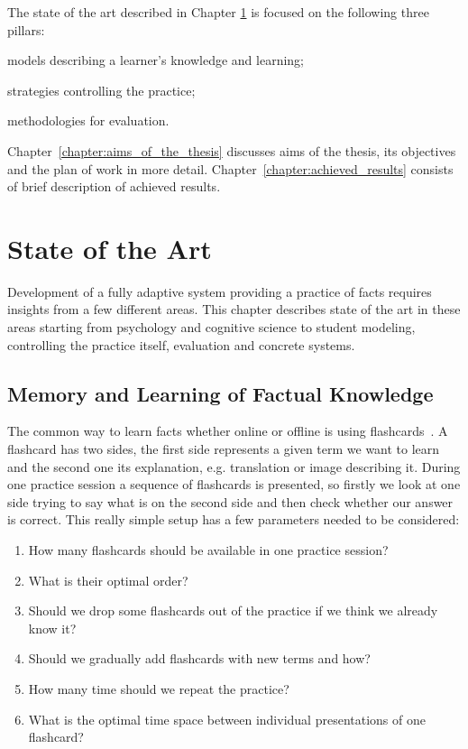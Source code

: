 \documentclass[table,color,cover,twoside,nolot,nolof]{fithesis3/fithesis3}
\begin{document}
The state of the art described in Chapter
\ref{chapter:state_of_the_art} is focused on the following three pillars:
\begin{enumerate*}[label=(\arabic*)]
	\item models describing a learner's knowledge and learning;
	\item strategies controlling the practice;
	\item methodologies for evaluation.
\end{enumerate*}
Chapter~\ref{chapter:aims_of_the_thesis} discusses aims of the thesis, its
objectives and the plan of work in more detail.
Chapter~\ref{chapter:achieved_results} consists of brief description of
achieved results.

\chapter{State of the Art}
\label{chapter:state_of_the_art}

Development of a fully adaptive system providing a practice of facts requires
insights from a few different areas. This chapter describes state of the art in
these areas starting from psychology and cognitive science to student
modeling, controlling the practice itself, evaluation and concrete systems.

\section{Memory and Learning of Factual Knowledge}
\label{section:models}

The common way to learn facts whether online or offline is using
flashcards~\cite{kornell2008optimising}. A flashcard has two sides, the first
side represents a given term we want to learn and the second one its
explanation, e.g. translation or image describing it.  During one practice
session a sequence of flashcards is presented, so firstly we look at one side
trying to say what is on the second side and then check whether our answer is
correct. This really simple setup has a few parameters needed to be considered:

\begin{enumerate}
	\item How many flashcards should be available in one practice session?
	\item What is their optimal order?
	\item Should we drop some flashcards out of the practice if we think we already know it?
	\item Should we gradually add flashcards with new terms and how?
	\item How many time should we repeat the practice?
	\item What is the optimal time space between individual presentations of one flashcard?
\end{enumerate}
\end{document}
